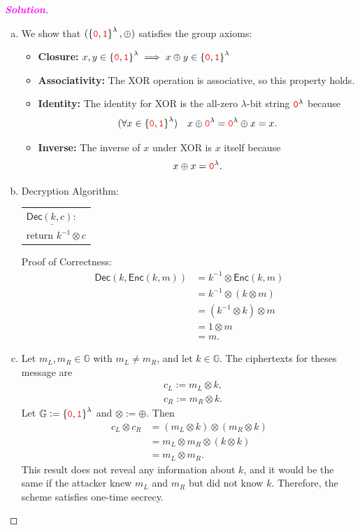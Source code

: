 \documentclass[12pt,openany]{book}
\theoremstyle{definition}
\newcommand{\G}{\mathbb{G}}
\newcommand{\inv}[1]{#1^{-1}}
\newcommand{\sol}{\textcolor{magenta}{\bf Solution}}
\newcommand{\Enc}{\mathsf{Enc}}
\newcommand{\Dec}{\mathsf{Dec}}
\newcommand{\zero}{\textcolor{red}{\texttt{0}}}
\newcommand{\one}{\textcolor{red}{\texttt{1}}}
\newcommand{\tab}{\hspace{12pt}}
\newcommand{\xor}{\oplus}
\newcommand{\binaryfield}{\set{\zero,\one}}
\begin{document}
	\iffalse
	\begin{proof}[\sol]
		\begin{enumerate}[(a)]
			\item We show that \((\binaryfield^\lambda,\xor)\) satisfies the group axioms:
			\begin{itemize}
				\item[] \textbf{Closure:} \(x,y\in\binaryfield^\lambda\implies x\xor y\in\binaryfield^\lambda\)
				\item[] \textbf{Associativity:} The XOR operation is associative, so this property holds.
				\item[] \textbf{Identity:} The identity for XOR is the all-zero \(\lambda\)-bit string \(\zero^\lambda\) because \[
				(\forall x\in\binaryfield^\lambda)\quad x\xor\zero^\lambda=\zero^\lambda\xor x= x.
				\]
				\item[] \textbf{Inverse:} The inverse of $x$ under XOR is $x$ itself because \[
				x\xor x=\zero^\lambda.
				\]
			\end{itemize}
			\vspace{4pt}
			\item Decryption Algorithm: \begin{center}
				\begin{tabular}{l}
					\(\underline{\Dec(k,c):}\) \\ \tab return \(\inv{k}\otimes c\)
				\end{tabular}
			\end{center}
			Proof of Correctness: \begin{align*}
				\Dec(k,\Enc(k,m))&=\inv{k}\otimes\Enc(k,m)\\
				&=\inv{k}\otimes(k\otimes m)\\
				&=(\inv{k}\otimes k)\otimes m\\
				&=1\otimes m\\
				&=m.
			\end{align*}
			\item Let $m_L,m_R\in\G$ with $m_L\neq m_R$, and let $k\in\G$. The ciphertexts for theses message are \begin{align*}
				&c_L:=m_L\otimes k,\\
				&c_R:=m_R\otimes k.
			\end{align*} Let $\G:=\binaryfield^\lambda$ and $\otimes:=\xor$. Then \begin{align*}
				c_L\otimes c_R&=(m_L\otimes k)\otimes(m_R\otimes k)\\
				&=m_L\otimes m_R\otimes(k\otimes k)\\
				&=m_L\otimes m_R.
			\end{align*} This result does not reveal any information about $k$, and it would be the same if the attacker knew $m_L$ and $m_R$ but did not know $k$. Therefore, the scheme satisfies one-time secrecy.
			

\end{enumerate}
\end{proof}
\end{document}
